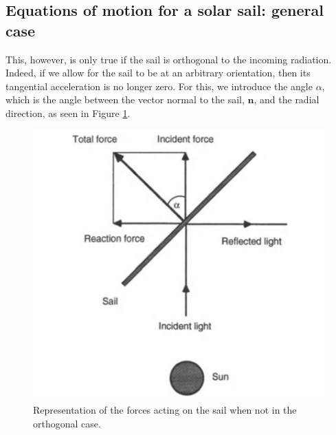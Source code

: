 \documentclass[twocolumn,12pt,a4paper]{article}
\numberwithin{equation}{section}
\begin{document}
\subsection{Equations of motion for a solar sail: general case}
This, however, is only true if the sail is orthogonal to the incoming radiation. Indeed, if we allow for the sail to be at an arbitrary orientation, then its tangential acceleration is no longer zero. For this, we introduce the angle \( \alpha \), which is the angle between the vector normal to the sail, \( \hat{\mathbf{n}} \), and the radial direction, as seen in Figure \ref{alpha}. 
\begin{figure}
	\centering
	\includegraphics[scale=.4]{alpha}
	\caption{Representation of the forces acting on the sail when not in the orthogonal case. \cite{mcinnes}}
	\label{alpha}
\end{figure}
\end{document}
